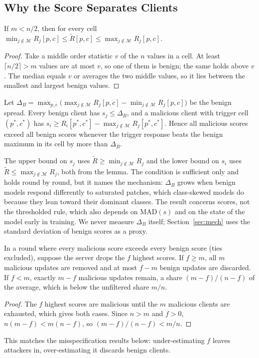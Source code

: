 \subsection{Why the Score Separates Clients}
\begin{lemma}
If $m<n/2$, then for every cell $\min_{j\notin\mathcal M}R_j[p,c]\le\tilde R[p,c]\le\max_{j\notin\mathcal M}R_j[p,c]$.
\end{lemma}
\begin{proof}
Take a middle order statistic $v$ of the $n$ values in a cell. At least $\lceil n/2\rceil>m$ values are at most $v$, so one of them is benign; the same holds above $v$. The median equals $v$ or averages the two middle values, so it lies between the smallest and largest benign values.
\end{proof}
\begin{proposition}
Let $\Delta_B=\max_{p,c}\bigl(\max_{j\notin\mathcal M}R_j[p,c]-\min_{j\notin\mathcal M}R_j[p,c]\bigr)$ be the benign spread. Every benign client has $s_j\le\Delta_B$, and a malicious client with trigger cell $(p^*,c^*)$ has $s_i\ge R_i[p^*,c^*]-\max_{j\notin\mathcal M}R_j[p^*,c^*]$. Hence all malicious scores exceed all benign scores whenever the trigger response beats the benign maximum in its cell by more than $\Delta_B$.
\end{proposition}
The upper bound on $s_j$ uses $\tilde R\ge\min_{j\notin\mathcal M}R_j$ and the lower bound on $s_i$ uses $\tilde R\le\max_{j\notin\mathcal M}R_j$, both from the lemma. The condition is sufficient only and holds round by round, but it names the mechanism: $\Delta_B$ grows when benign models respond differently to saturated patches, which class-skewed models do because they lean toward their dominant classes. The result concerns scores, not the thresholded rule, which also depends on $\mathrm{MAD}(s)$ and on the state of the model early in training. We never measure $\Delta_B$ itself; Section~\ref{sec:mech} uses the standard deviation of benign scores as a proxy.
\begin{proposition}
In a round where every malicious score exceeds every benign score (ties excluded), suppose the server drops the $f$ highest scores. If $f\ge m$, all $m$ malicious updates are removed and at most $f-m$ benign updates are discarded. If $f<m$, exactly $m-f$ malicious updates remain, a share $(m-f)/(n-f)$ of the average, which is below the unfiltered share $m/n$.
\end{proposition}
\begin{proof}
The $f$ highest scores are malicious until the $m$ malicious clients are exhausted, which gives both cases. Since $n>m$ and $f>0$, $n(m-f)<m(n-f)$, so $(m-f)/(n-f)<m/n$.
\end{proof}
This matches the misspecification results below: under-estimating $f$ leaves attackers in, over-estimating it discards benign clients.

